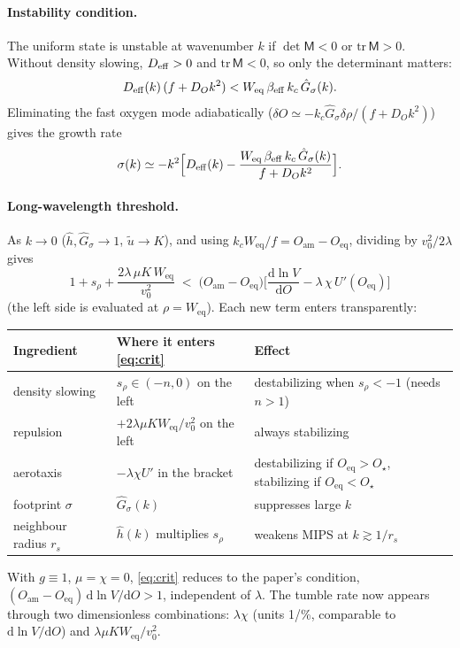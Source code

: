 \documentclass[11pt,a4paper]{article}
\newcommand{\dd}{\mathrm{d}}
\newcommand{\Oam}{O_{\mathrm{am}}}
\newcommand{\Oeq}{O_{\mathrm{eq}}}
\newcommand{\Weq}{W_{\mathrm{eq}}}
\newcommand{\Ostar}{O_{\star}}
\begin{document}
\paragraph{Instability condition.}
The uniform state is unstable at wavenumber $k$ if $\det\mathsf{M}<0$ or $\mathrm{tr}\,\mathsf{M}>0$. Without density slowing, $D_{\rm eff}>0$ and $\mathrm{tr}\,\mathsf{M}<0$, so only the determinant matters:
\begin{equation}
D_{\rm eff}(k)\,(f+D_Ok^2)<\Weq\,\beta_{\rm eff}\,k_c\,\hat G_\sigma(k).
\end{equation}
Eliminating the fast oxygen mode adiabatically ($\delta O\simeq-k_c\hat G_\sigma\delta\rho/(f+D_Ok^2)$) gives the growth rate
\begin{equation}
\sigma(k)\simeq-k^2\Big[D_{\rm eff}(k)-\frac{\Weq\,\beta_{\rm eff}\,k_c\,\hat G_\sigma(k)}{f+D_Ok^2}\Big].
\end{equation}

\paragraph{Long-wavelength threshold.}
As $k\to0$ ($\hat h,\hat G_\sigma\to1$, $\tilde u\to K$), and using $k_c\Weq/f=\Oam-\Oeq$, dividing by $v_0^2/2\lambda$ gives
\begin{equation}
\boxed{\;1+s_\rho+\frac{2\lambda\,\mu K\,\Weq}{v_0^{2}}\;<\;\big(\Oam-\Oeq\big)\Big[\frac{\dd\ln V}{\dd O}-\lambda\,\chi\,U'(\Oeq)\Big]\;}
\label{eq:crit}
\end{equation}
(the left side is evaluated at $\rho=\Weq$). Each new term enters transparently:
\begin{center}
\begin{tabular}{lll}
\toprule
Ingredient & Where it enters \eqref{eq:crit} & Effect\\
\midrule
density slowing & $s_\rho\in(-n,0)$ on the left & destabilizing when $s_\rho<-1$ (needs $n>1$)\\
repulsion & $+2\lambda\mu K\Weq/v_0^2$ on the left & always stabilizing\\
aerotaxis & $-\lambda\chi U'$ in the bracket & destabilizing if $\Oeq>\Ostar$, stabilizing if $\Oeq<\Ostar$\\
footprint $\sigma$ & $\hat G_\sigma(k)$ & suppresses large $k$\\
neighbour radius $r_s$ & $\hat h(k)$ multiplies $s_\rho$ & weakens MIPS at $k\gtrsim1/r_s$\\
\bottomrule
\end{tabular}
\end{center}
With $g\equiv1$, $\mu=\chi=0$, \eqref{eq:crit} reduces to the paper's condition, $(\Oam-\Oeq)\,\dd\ln V/\dd O>1$, independent of $\lambda$. The tumble rate now appears through two dimensionless combinations: $\lambda\chi$ (units 1/\%, comparable to $\dd\ln V/\dd O$) and $\lambda\mu K\Weq/v_0^2$.
\end{document}

